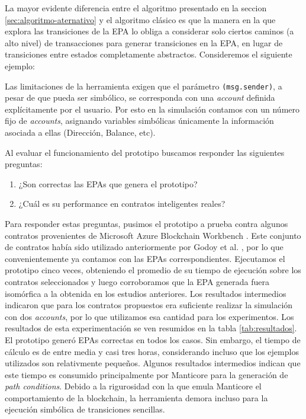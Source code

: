 La mayor evidente diferencia entre el algoritmo presentado en la seccion \ref{sec:algoritmo-aternativo} y el algoritmo clásico es que la manera en la que explora las transiciones de la EPA lo obliga a considerar solo ciertos caminos (a alto nivel) de transacciones para generar transiciones en la EPA, en lugar de transiciones entre estados completamente abstractos.
Consideremos el siguiente ejemplo:




Las limitaciones de la herramienta exigen que el parámetro \texttt{(msg.sender)}, a pesar de que pueda ser simbólico, se corresponda con una \textit{account} definida explícitamente por el usuario.
Por esto en la simulación contamos con un número fijo de \textit{accounts}, asignando variables simbólicas únicamente la información asociada a ellas (Dirección, Balance, etc).

Al evaluar el funcionamiento del prototipo buscamos responder las siguientes preguntas:
\begin{enumerate}
    \item ¿Son correctas las EPAs que genera el prototipo?
    \item ¿Cuál es su performance en contratos inteligentes reales?
\end{enumerate}
Para responder estas preguntas, pusimos el prototipo a prueba contra algunos contratos provenientes de Microsoft Azure Blockchain Workbench \cite{azure-benchmark}.
Este conjunto de contratos había sido utilizado anteriormente por Godoy et al. \cite{predicate-abstraction-for-smart-contract-validation}, por lo que convenientemente ya contamos con las EPAs correspondientes.
Ejecutamos el prototipo cinco veces, obteniendo el promedio de su tiempo de ejecución sobre los contratos seleccionados y luego corroboramos que la EPA generada fuera isomórfica a la obtenida en los estudios anteriores.
Los resultados intermedios indicaron que para los contratos propuestos era suficiente realizar la simulación con dos \textit{accounts}, por lo que utilizamos esa cantidad para los experimentos.
Los resultados de esta experimentación se ven resumidos en la tabla \ref{tab:resultados}.
El prototipo generó EPAs correctas en todos los casos.
Sin embargo, el tiempo de cálculo es de entre media y casi tres horas, considerando incluso que los ejemplos utilizados son relativmente pequeños.
Algunos resultados intermedios indican que este tiempo es consumido principalmente por Manticore para la generación de \textit{path conditions}.
Debido a la rigurosidad con la que emula Manticore el comportamiento de la blockchain, la herramienta demora incluso para la ejecución simbólica de transiciones sencillas.

